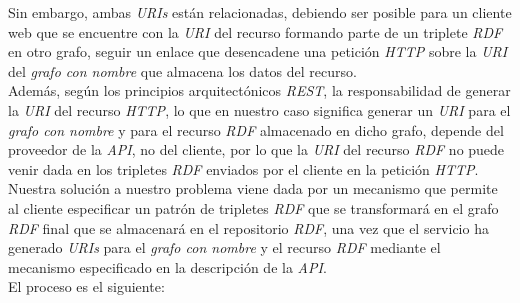 Sin embargo, ambas \textit{URIs} est\'an relacionadas, debiendo ser posible para un cliente web que se encuentre con la \textit{URI} del recurso formando parte de un triplete \textit{RDF} en otro grafo, seguir un enlace que desencadene una petici\'on \textit{HTTP} sobre la \textit{URI} del \textit{grafo con nombre} que almacena los datos del recurso.\\
Adem\'as, seg\'un los principios arquitect\'onicos \textit{REST}, la responsabilidad de generar la \textit{URI} del recurso \textit{HTTP}, lo que en nuestro caso significa generar un \textit{URI} para el \textit{grafo con nombre} y para el recurso \textit{RDF} almacenado en dicho grafo, depende del proveedor de la \textit{API}, no del cliente, por lo que la \textit{URI} del recurso \textit{RDF} no puede venir dada en los tripletes \textit{RDF} enviados por el cliente en la petici\'on \textit{HTTP}.\\
Nuestra soluci\'on a nuestro problema viene dada por un mecanismo que permite al cliente especificar un patr\'on de tripletes \textit{RDF} que se transformar\'a en el grafo \textit{RDF} final que se almacenar\'a en el repositorio \textit{RDF}, una vez que el servicio ha generado \textit{URIs} para el \textit{grafo con nombre} y el recurso \textit{RDF} mediante el mecanismo especificado en la descripci\'on de la \textit{API}.\\
El proceso es el siguiente:\\

